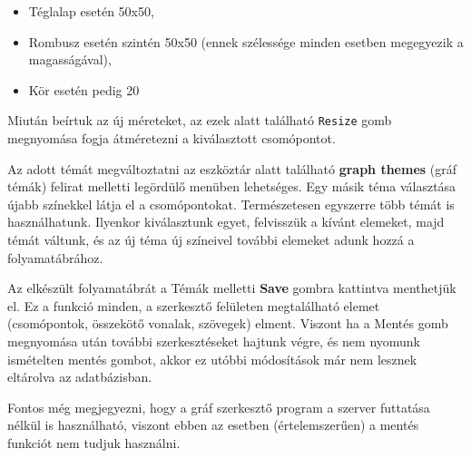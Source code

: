 \begin{itemize}
\item Téglalap esetén 50x50,
\item Rombusz esetén szintén 50x50 (ennek szélessége minden esetben megegyezik a magasságával), 
\item Kör esetén pedig 20
\end{itemize}

Miután beírtuk az új méreteket, az ezek alatt található \texttt{Resize} gomb megnyomása fogja átméretezni a kiválasztott csomópontot.


Az adott témát megváltoztatni az eszköztár alatt található \textbf{graph themes} (gráf témák) felirat melletti legördülő menüben lehetséges. Egy másik téma választása újabb színekkel látja el a csomópontokat. Természetesen egyszerre több témát is használhatunk. Ilyenkor kiválasztunk egyet, felvisszük a kívánt elemeket, majd témát váltunk, és az új téma új színeivel további elemeket adunk hozzá a folyamatábrához.


Az elkészült folyamatábrát a Témák melletti \textbf{Save} gombra kattintva menthetjük el. Ez a funkció minden, a szerkesztő felületen megtalálható elemet (csomópontok, összekötő vonalak, szövegek) elment. Viszont ha a Mentés gomb megnyomása után további szerkesztéseket hajtunk végre, és nem nyomunk ismételten mentés gombot, akkor ez utóbbi módosítások már nem lesznek eltárolva az adatbázisban.

Fontos még megjegyezni, hogy a gráf szerkesztő program a szerver futtatása nélkül is használható, viszont ebben az esetben (értelemszerűen) a mentés funkciót nem tudjuk használni.